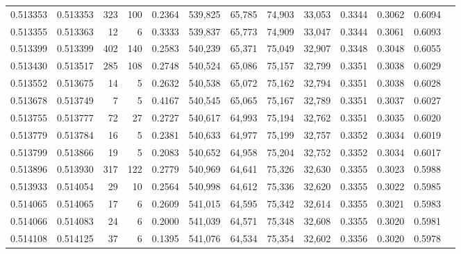 \begin{tabular}{rrrrrrrrrrrrr}
0.513353 & 0.513353 &   323 &   100 &                                     0.2364 & 539,825 &  65,785 &  74,903 &  33,053 & 0.3344 & 0.3062 & 0.6094 \\
0.513355 & 0.513363 &    12 &     6 &                                     0.3333 & 539,837 &  65,773 &  74,909 &  33,047 & 0.3344 & 0.3061 & 0.6093 \\
0.513399 & 0.513399 &   402 &   140 &                                     0.2583 & 540,239 &  65,371 &  75,049 &  32,907 & 0.3348 & 0.3048 & 0.6055 \\
0.513430 & 0.513517 &   285 &   108 &                                     0.2748 & 540,524 &  65,086 &  75,157 &  32,799 & 0.3351 & 0.3038 & 0.6029 \\
0.513552 & 0.513675 &    14 &     5 &                                     0.2632 & 540,538 &  65,072 &  75,162 &  32,794 & 0.3351 & 0.3038 & 0.6028 \\
0.513678 & 0.513749 &     7 &     5 &                                     0.4167 & 540,545 &  65,065 &  75,167 &  32,789 & 0.3351 & 0.3037 & 0.6027 \\
0.513755 & 0.513777 &    72 &    27 &                                     0.2727 & 540,617 &  64,993 &  75,194 &  32,762 & 0.3351 & 0.3035 & 0.6020 \\
0.513779 & 0.513784 &    16 &     5 &                                     0.2381 & 540,633 &  64,977 &  75,199 &  32,757 & 0.3352 & 0.3034 & 0.6019 \\
0.513799 & 0.513866 &    19 &     5 &                                     0.2083 & 540,652 &  64,958 &  75,204 &  32,752 & 0.3352 & 0.3034 & 0.6017 \\
0.513896 & 0.513930 &   317 &   122 &                                     0.2779 & 540,969 &  64,641 &  75,326 &  32,630 & 0.3355 & 0.3023 & 0.5988 \\
0.513933 & 0.514054 &    29 &    10 &                                     0.2564 & 540,998 &  64,612 &  75,336 &  32,620 & 0.3355 & 0.3022 & 0.5985 \\
0.514065 & 0.514065 &    17 &     6 &                                     0.2609 & 541,015 &  64,595 &  75,342 &  32,614 & 0.3355 & 0.3021 & 0.5983 \\
0.514066 & 0.514083 &    24 &     6 &                                     0.2000 & 541,039 &  64,571 &  75,348 &  32,608 & 0.3355 & 0.3020 & 0.5981 \\
0.514108 & 0.514125 &    37 &     6 &                                     0.1395 & 541,076 &  64,534 &  75,354 &  32,602 & 0.3356 & 0.3020 & 0.5978 \\

\end{tabular}
